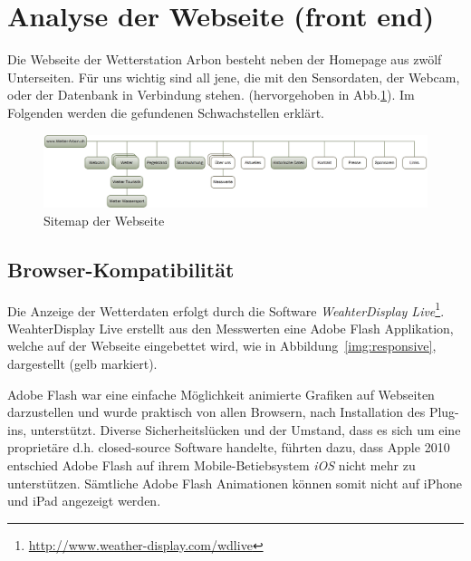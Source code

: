 \section{Analyse der Webseite (front end)}

Die Webseite der Wetterstation Arbon besteht neben der Homepage aus zwölf Unterseiten. Für uns wichtig sind all jene, die mit den Sensordaten, der Webcam, oder der Datenbank in Verbindung stehen. (hervorgehoben in Abb.\ref{img:sitemap}). Im Folgenden werden die gefundenen Schwachstellen erklärt.

\begin{figure}[h!]
	\centering
	\includegraphics[width=0.9\linewidth]{img/sitemap2}
	\caption{Sitemap der Webseite}
	\label{img:sitemap}
\end{figure}


\subsection{Browser-Kompatibilität}
\label{subsec:flash}
Die Anzeige der Wetterdaten erfolgt durch die Software \textit{WeahterDisplay Live}\footnote{ \url{http://www.weather-display.com/wdlive}}. WeahterDisplay Live erstellt aus den Messwerten eine Adobe Flash Applikation, welche auf der Webseite eingebettet wird, wie in Abbildung~\ref{img:responsive}, dargestellt (gelb markiert).
\newline

\noindent
Adobe Flash war eine einfache Möglichkeit animierte Grafiken auf Webseiten darzustellen und wurde praktisch von allen Browsern, nach Installation des Plug-ins, unterstützt. Diverse Sicherheitslücken und der Umstand, dass es sich um eine proprietäre d.h. closed-source Software handelte, führten dazu, dass Apple 2010 entschied Adobe Flash auf ihrem Mobile-Betiebsystem \textit{iOS} nicht mehr zu unterstützen\cite{Apple:ThoughtsOnFlash}. Sämtliche Adobe Flash Animationen können somit nicht auf iPhone und iPad angezeigt werden.

